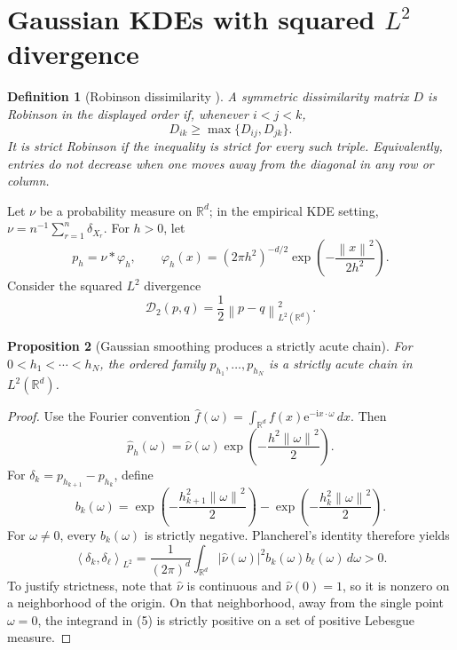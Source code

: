 \documentclass[11pt,a4paper]{article}
\theoremstyle{clean}
\newtheorem{definition}{Definition}[section]
\newtheorem{proposition}[definition]{Proposition}
\theoremstyle{remark}
\newcommand{\R}{\mathbb{R}}
\newcommand{\ip}[2]{\left\langle #1,#2\right\rangle}
\newcommand{\norm}[1]{\left\lVert #1\right\rVert}
\newcommand{\e}{\mathrm{e}}
\begin{document}
\section{Gaussian KDEs with squared \texorpdfstring{$L^2$}{L2} divergence}

\begin{definition}[Robinson dissimilarity \cite{carmona2024}]
A symmetric dissimilarity matrix $D$ is Robinson in the displayed order if,
whenever $i<j<k$,
\[
  D_{ik}\geq\max\{D_{ij},D_{jk}\}.
\]
It is \emph{strict Robinson} if the inequality is strict for every such triple.
Equivalently, entries do not decrease when one moves away from the diagonal in
any row or column.
\end{definition}

Let $\nu$ be a probability measure on $\R^d$; in the empirical KDE setting,
$\nu=n^{-1}\sum_{r=1}^n\delta_{X_r}$.  For $h>0$, let
\[
  p_h=\nu*\varphi_h,
  \qquad
  \varphi_h(x)=(2\pi h^2)^{-d/2}
  \exp\!\left(-\frac{\norm{x}^2}{2h^2}\right).
\]
Consider the squared $L^2$ divergence
\[
  \mathcal D_2(p,q)=\frac12\norm{p-q}_{L^2(\R^d)}^2.
\]

\begin{proposition}[Gaussian smoothing produces a strictly acute chain]
\label{prop:gaussian-acute}
For $0<h_1<\cdots<h_N$, the ordered family
$p_{h_1},\ldots,p_{h_N}$ is a strictly acute chain in $L^2(\R^d)$.
\end{proposition}

\begin{proof}
Use the Fourier convention
$\widehat f(\omega)=\int_{\R^d}f(x)\e^{-\mathrm{i}x\cdot\omega}\,dx$.
Then
\[
  \widehat p_h(\omega)
  =\widehat\nu(\omega)\exp\!\left(-\frac{h^2\norm{\omega}^2}{2}\right).
\]
For $\delta_k=p_{h_{k+1}}-p_{h_k}$, define
\[
  b_k(\omega)=
  \exp\!\left(-\frac{h_{k+1}^2\norm{\omega}^2}{2}\right)
  -\exp\!\left(-\frac{h_k^2\norm{\omega}^2}{2}\right).
\]
For $\omega\neq0$, every $b_k(\omega)$ is strictly negative.  Plancherel's
identity therefore yields
\[
  \ip{\delta_k}{\delta_\ell}_{L^2}
  =\frac{1}{(2\pi)^d}\int_{\R^d}
    |\widehat\nu(\omega)|^2 b_k(\omega)b_\ell(\omega)\,d\omega>0.       \tag{5}
\]
To justify strictness, note that $\widehat\nu$ is continuous and
$\widehat\nu(0)=1$, so it is nonzero on a neighborhood of the origin.  On that
neighborhood, away from the single point $\omega=0$, the integrand in (5) is
strictly positive on a set of positive Lebesgue measure.
\end{proof}
\end{document}
